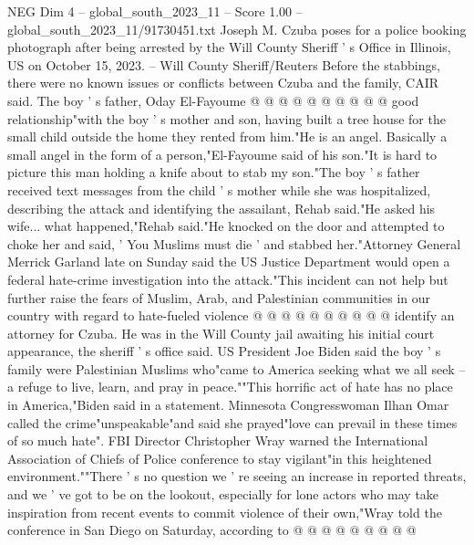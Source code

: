 \begin{textsample}{NEG Dim 4 – global\_south\_2023\_11 – Score 1.00 – global\_south\_2023\_11/91730451.txt}
Joseph M.
Czuba poses for a police booking photograph after being arrested by the Will County Sheriff ' s Office in Illinois, US on October 15, 2023. -- Will County Sheriff/Reuters Before the stabbings, there were no known issues or conflicts between Czuba and the family, CAIR said.
The boy ' s father, Oday El-Fayoume @ @ @ @ @ @ @ @ @ @ good relationship"with the boy ' s mother and son, having built a tree house for the small child outside the home they rented from him."He is an angel.
Basically a small angel in the form of a person,"El-Fayoume said of his son."It is hard to picture this man holding a knife about to stab my son."The boy ' s father received text messages from the child ' s mother while she was hospitalized, describing the attack and identifying the assailant, Rehab said."He asked his wife... what happened,"Rehab said."He knocked on the door and attempted to choke her and said, ' You Muslims must die ' and stabbed her."Attorney General Merrick Garland late on Sunday said the US Justice Department would open a federal hate-crime investigation into the attack."This incident can not help but further raise the fears of Muslim, Arab, and Palestinian communities in our country with regard to hate-fueled violence @ @ @ @ @ @ @ @ @ @ identify an attorney for Czuba.
He was in the Will County jail awaiting his initial court appearance, the sheriff ' s office said.
US President Joe Biden said the boy ' s family were Palestinian Muslims who"came to America seeking what we all seek -- a refuge to live, learn, and pray in peace.""This horrific act of hate has no place in America,"Biden said in a statement.
Minnesota Congresswoman Ilhan Omar called the crime"unspeakable"and said she prayed"love can prevail in these times of so much hate".
FBI Director Christopher Wray warned the International Association of Chiefs of Police conference to stay vigilant"in this heightened environment.""There ' s no question we ' re seeing an increase in reported threats, and we ' ve got to be on the lookout, especially for lone actors who may take inspiration from recent events to commit violence of their own,"Wray told the conference in San Diego on Saturday, according to @ @ @ @ @ @ @ @ @

\end{textsample}
